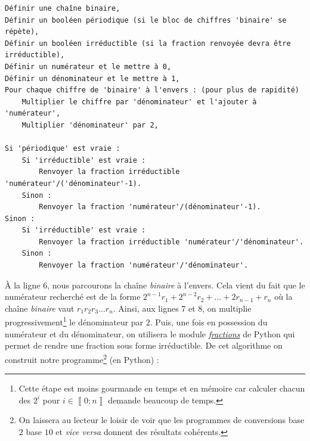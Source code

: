 \documentclass[a4paper,french,12pt]{article}
\begin{document}
\begin{center}
\begin{verbatim}
Définir une chaîne binaire,
Définir un booléen périodique (si le bloc de chiffres 'binaire' se répète),
Définir un booléen irréductible (si la fraction renvoyée devra être irréductible),
Définir un numérateur et le mettre à 0,
Définir un dénominateur et le mettre à 1,
Pour chaque chiffre de 'binaire' à l'envers : (pour plus de rapidité)
    Multiplier le chiffre par 'dénominateur' et l'ajouter à 'numérateur',
    Multiplier 'dénominateur' par 2,
    
Si 'périodique' est vraie :
    Si 'irréductible' est vraie :
        Renvoyer la fraction irréductible 'numérateur'/('dénominateur'-1).
    Sinon :
        Renvoyer la fraction 'numérateur'/(dénominateur'-1).
Sinon : 
    Si 'irréductible' est vraie :
        Renvoyer la fraction irréductible 'numérateur'/'dénominateur'.
    Sinon :
        Renvoyer la fraction 'numérateur'/'dénominateur'.
\end{verbatim}
\end{center}

À la ligne $6$, nous parcourons la chaîne \emph{binaire} à l'envers. Cela vient du fait que le numérateur recherché est de la forme $2^{n-1}r_1+2^{n-2}r_2+\ldots+2r_{n-1}+r_n$ où la chaîne \emph{binaire} vaut $r_1r_2r_3\ldots r_n$. Ainsi, aux lignes $7$ et $8$, on multiplie progressivement\footnote{Cette étape est moins gourmande en temps et en mémoire car calculer chacun des $2^i$ pour $i\in\left\llbracket0;n\right\rrbracket$ demande beaucoup de temps.} le dénominateur par $2$. Puis, une fois en possession du numérateur et du dénominateur, on utilisera le module \href{https://docs.python.org/3.6/library/fractions.html}{\emph{fractions}} de Python qui permet de rendre une fraction sous forme irréductible. De cet algorithme on construit notre programme\footnote{On laissera au lecteur le loisir de voir que les programmes de conversions base $2$ base $10$ et \emph{vice versa} donnent des résultats cohérents.} (en Python) :
\end{document}
